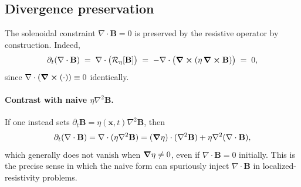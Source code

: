 \documentclass[11pt]{article}
\theoremstyle{plain}
\theoremstyle{definition}
\theoremstyle{remark}
\newcommand{\diver}{\nabla\cdot}
\newcommand{\B}{\mathbf{B}}
\begin{document}
\subsection{Divergence preservation}
The solenoidal constraint $\diver\B=0$ is preserved by the resistive operator by construction. Indeed,
\begin{equation}\label{eq:app_divB_preserve}
  \partial_t(\diver\B)
  \;=\;
  \diver\big(\mathcal{R}_{\eta}[\B]\big)
  \;=\;
  -\diver\big(\curl(\eta\,\curl\B)\big)
  \;=\; 0,
\end{equation}
since $\diver(\curl(\cdot))\equiv 0$ identically.

\paragraph{Contrast with naive $\eta\nabla^2\B$.}
If one instead sets $\partial_t\B=\eta(\mathbf{x},t)\nabla^2\B$, then
\[
\partial_t(\diver\B)=\diver(\eta\nabla^2\B)
=(\grad\eta)\cdot(\nabla^2\B)+\eta\nabla^2(\diver\B),
\]
which generally does not vanish when $\grad\eta\neq 0$, even if $\diver\B=0$ initially. This is the
precise sense in which the naive form can spuriously inject $\diver\B$ in localized-resistivity
problems.
\end{document}
